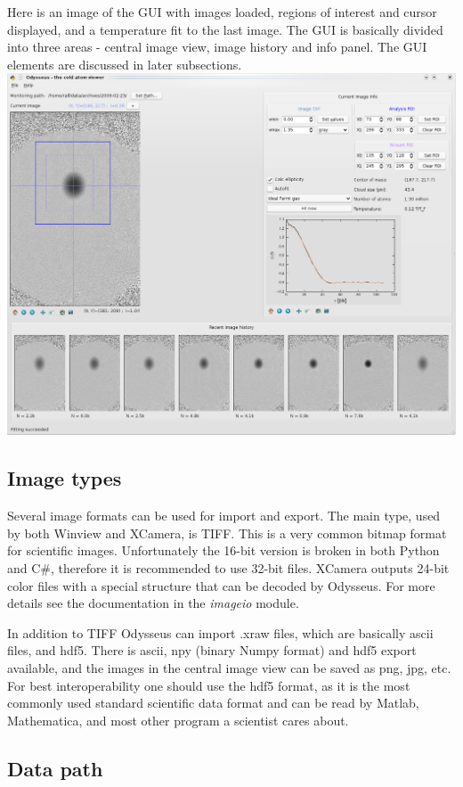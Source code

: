 \documentclass[letterpaper,10pt,english]{manual}
\begin{document}
Here is an image of the GUI with images loaded, regions of interest and cursor displayed, and a temperature fit to the last image. The GUI is basically divided into three areas - central image view, image history and info panel. The GUI elements are discussed in later subsections.
\includegraphics[width=500pt]{odysseusgui.png}

\subsection{Image types}

Several image formats can be used for import and export. The main type, used by both Winview and XCamera, is TIFF. This is a very common bitmap format for scientific images. Unfortunately the 16-bit version is broken in both Python and C\#, therefore it is recommended to use 32-bit files. XCamera outputs 24-bit color files with a special structure that can be decoded by Odysseus. For more details see the documentation in the \emph{imageio} module.

In addition to TIFF Odysseus can import .xraw files, which are basically ascii files, and hdf5. There is ascii, npy (binary Numpy format) and hdf5 export available, and the images in the central image view can be saved as png, jpg, etc. For best interoperability one should use the hdf5 format, as it is the most commonly used standard scientific data format and can be read by Matlab, Mathematica, and most other program a scientist cares about.


\subsection{Data path}
\end{document}
